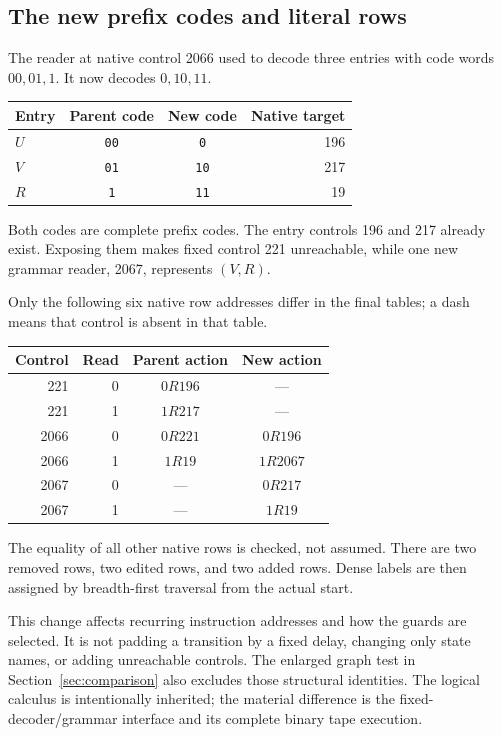 \documentclass[10pt,a4paper]{article}
\theoremstyle{definition}
\begin{document}
\subsection{The new prefix codes and literal rows}

The reader at native control 2066 used to decode three entries with code
words $00,01,1$. It now decodes $0,10,11$.
\begin{center}
\begin{tabular}{lccr}
\toprule Entry & Parent code & New code & Native target\\\midrule
$U$ & \texttt{00} & \texttt{0} & 196\\
$V$ & \texttt{01} & \texttt{10} & 217\\
$R$ & \texttt{1} & \texttt{11} & 19\\
\bottomrule
\end{tabular}
\end{center}
Both codes are complete prefix codes. The entry controls 196 and 217
already exist. Exposing them makes fixed control 221 unreachable, while
one new grammar reader, 2067, represents $(V,R)$.

Only the following six native row addresses differ in the final tables;
a dash means that control is absent in that table.
\begin{center}
\begin{tabular}{rrcc}
\toprule Control & Read & Parent action & New action\\\midrule
221 & 0 & $0R196$ & ---\\
221 & 1 & $1R217$ & ---\\
2066 & 0 & $0R221$ & $0R196$\\
2066 & 1 & $1R19$ & $1R2067$\\
2067 & 0 & --- & $0R217$\\
2067 & 1 & --- & $1R19$\\
\bottomrule
\end{tabular}
\end{center}
The equality of all other native rows is checked, not assumed. There
are two removed rows, two edited rows, and two added rows. Dense labels
are then assigned by breadth-first traversal from the actual start.

This change affects recurring instruction addresses and how the guards
are selected. It is not padding a transition by a fixed delay, changing
only state names, or adding unreachable controls. The enlarged graph
test in Section~\ref{sec:comparison} also excludes those structural
identities. The logical calculus is intentionally inherited; the
material difference is the fixed-decoder/grammar interface and its
complete binary tape execution.
\end{document}
